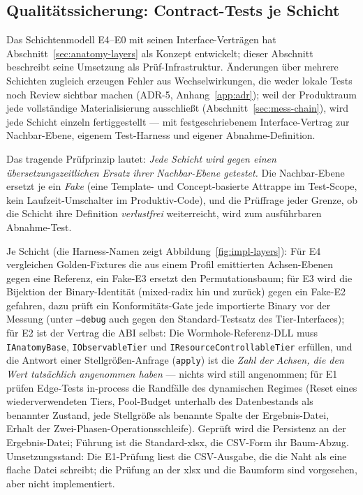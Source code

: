 \begin{nurkurz}
\section{Qualitätssicherung: Contract-Tests je Schicht}\label{sec:impl-contracts}
Das Schichtenmodell E4--E0 mit seinen Interface-Verträgen hat Abschnitt~\ref{sec:anatomy-layers} als
Konzept entwickelt; dieser Abschnitt beschreibt seine Umsetzung als Prüf-Infrastruktur. Änderungen über
mehrere Schichten zugleich erzeugen Fehler aus Wechselwirkungen, die weder lokale Tests noch Review
sichtbar machen (ADR-5, Anhang~\ref{app:adr}); weil der Produktraum jede vollständige Materialisierung
ausschließt (Abschnitt~\ref{sec:mess-chain}), wird jede Schicht einzeln fertiggestellt --- mit
festgeschriebenem Interface-Vertrag zur Nachbar-Ebene, eigenem Test-Harness und eigener
Abnahme-Definition.

Das tragende Prüfprinzip lautet: \emph{Jede Schicht wird gegen einen übersetzungszeitlichen Ersatz ihrer
Nachbar-Ebene getestet.} Die Nachbar-Ebene ersetzt je ein \emph{Fake} (eine Template- und Concept-basierte
Attrappe im Test-Scope, kein Laufzeit-Umschalter im Produktiv-Code), und die Prüffrage jeder Grenze, ob
die Schicht ihre Definition \emph{verlustfrei} weiterreicht, wird zum ausführbaren Abnahme-Test.

Je Schicht (die Harness-Namen zeigt Abbildung~\ref{fig:impl-layers}): Für E4 vergleichen Golden-Fixtures
die aus einem Profil emittierten Achsen-Ebenen gegen eine Referenz, ein Fake-E3 ersetzt den
Permutationsbaum; für E3 wird die Bijektion der Binary-Identität (mixed-radix hin und zurück) gegen ein
Fake-E2 gefahren, dazu prüft ein Konformitäts-Gate jede importierte Binary vor der Messung (unter
\texttt{--debug} auch gegen den Standard-Testsatz des Tier-Interfaces); für E2 ist der
Vertrag die ABI selbst: Die Wormhole-Referenz-DLL muss \texttt{IAnatomyBase}, \texttt{IObservableTier}
und \texttt{IResourceControllableTier} erfüllen, und die Antwort einer Stellgrößen-Anfrage
(\texttt{apply}) ist die \emph{Zahl der Achsen, die den Wert tatsächlich angenommen haben} --- nichts wird
still angenommen; für E1 prüfen Edge-Tests in-process die Randfälle des dynamischen Regimes (Reset eines
wiederverwendeten Tiers, Pool-Budget unterhalb des Datenbestands als benannter Zustand, jede Stellgröße
als benannte Spalte der Ergebnis-Datei, Erhalt der Zwei-Phasen-Operationsschleife). Geprüft wird die
Persistenz an der Ergebnis-Datei; Führung ist die Standard-xlsx, die CSV-Form ihr Baum-Abzug.
Umsetzungsstand: Die E1-Prüfung liest die CSV-Ausgabe, die die Naht als eine flache Datei schreibt; die
Prüfung an der xlsx und die Baumform sind vorgesehen, aber nicht implementiert.


\end{nurkurz}
